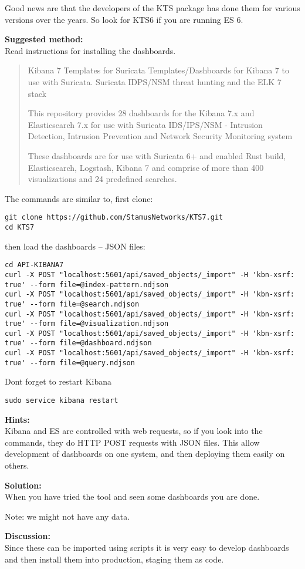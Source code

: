 \documentclass[a4paper,11pt,notitlepage]{report}
\begin{document}
Good news are that the developers of the KTS package has done them for various versions over the years. So look for KTS6 if you are running ES 6.

{\bf Suggested method:}\\
Read instructions for installing the dashboards.


\begin{quote}
Kibana 7 Templates for Suricata
Templates/Dashboards for Kibana 7 to use with Suricata. Suricata IDPS/NSM threat hunting and the ELK 7 stack

This repository provides 28 dashboards for the Kibana 7.x and Elasticsearch 7.x for use with Suricata IDS/IPS/NSM - Intrusion Detection, Intrusion Prevention and Network Security Monitoring system

These dashboards are for use with Suricata 6+ and enabled Rust build, Elasticsearch, Logstash, Kibana 7 and comprise of more than 400 visualizations and 24 predefined searches.
\end{quote}

The commands are similar to, first clone:
\begin{verbatim}
git clone https://github.com/StamusNetworks/KTS7.git
cd KTS7
\end{verbatim}

then load the dashboards -- JSON files:
\begin{verbatim}
cd API-KIBANA7
curl -X POST "localhost:5601/api/saved_objects/_import" -H 'kbn-xsrf: true' --form file=@index-pattern.ndjson
curl -X POST "localhost:5601/api/saved_objects/_import" -H 'kbn-xsrf: true' --form file=@search.ndjson
curl -X POST "localhost:5601/api/saved_objects/_import" -H 'kbn-xsrf: true' --form file=@visualization.ndjson
curl -X POST "localhost:5601/api/saved_objects/_import" -H 'kbn-xsrf: true' --form file=@dashboard.ndjson
curl -X POST "localhost:5601/api/saved_objects/_import" -H 'kbn-xsrf: true' --form file=@query.ndjson
\end{verbatim}

Dont forget to restart Kibana
\begin{verbatim}
sudo service kibana restart
\end{verbatim}


{\bf Hints:}\\
Kibana and ES are controlled with web requests, so if you look into the commands, they do HTTP POST requests with JSON files. This allow development of dashboards on one system, and then deploying them easily on others.

{\bf Solution:}\\
When you have tried the tool and seen some dashboards you are done.

Note: we might not have any data.

{\bf Discussion:}\\
Since these can be imported using scripts it is very easy to develop dashboards and then install them into production, staging them as code.
\end{document}
